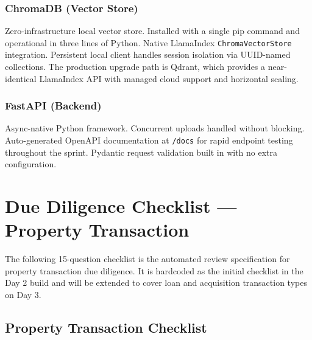 \documentclass[12pt, a4paper]{article}
\begin{document}
\subsubsection{ChromaDB (Vector Store)}

Zero-infrastructure local vector store. Installed with a single pip command and
operational in three lines of Python. Native LlamaIndex \texttt{ChromaVectorStore}
integration. Persistent local client handles session isolation via UUID-named
collections. The production upgrade path is Qdrant, which provides a near-identical
LlamaIndex API with managed cloud support and horizontal scaling.

\subsubsection{FastAPI (Backend)}

Async-native Python framework. Concurrent uploads handled without blocking.
Auto-generated OpenAPI documentation at \texttt{/docs} for rapid endpoint testing
throughout the sprint. Pydantic request validation built in with no extra
configuration.

\section{Due Diligence Checklist --- Property Transaction}

The following 15-question checklist is the automated review specification for
property transaction due diligence. It is hardcoded as the initial checklist in
the Day 2 build and will be extended to cover loan and acquisition transaction
types on Day 3.

\subsection{Property Transaction Checklist}
\end{document}
